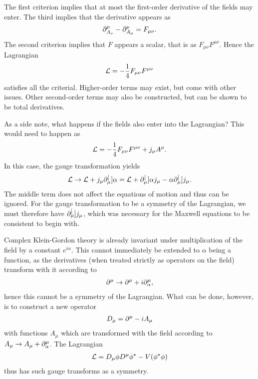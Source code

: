 The first criterion implies that at most the first-order derivative of the fields may enter. The third implies that the derivative appears as
\begin{align*}
	\partial^{\mu}_{A_{\nu}} - \partial^{\nu}_{A_{\mu}} = F_{\mu\nu}.
\end{align*}
The second criterion implies that $F$ appears a scalar, that is as $F_{\mu\nu}F^{\mu\nu}$. Hence the Lagrangian
\begin{align*}
	\mathcal{L} = -\frac{1}{4}F_{\mu\nu}F^{\mu\nu}
\end{align*}
satisfies all the criterial. Higher-order terms may exist, but come with other issues. Other second-order terms may also be constructed, but can be shown to be total derivatives.

As a side note, what happens if the fields also enter into the Lagrangian? This would need to happen as
\begin{align*}
	\mathcal{L} = -\frac{1}{4}F_{\mu\nu}F^{\mu\nu} + j_{\mu}A^{\mu}.
\end{align*}
In this case, the gauge transformation yields
\begin{align*}
	\mathcal{L} \to \mathcal{L} + j_{\mu}\partial^{[}_{\mu}]{}{\alpha} = \mathcal{L} + \partial^{[}_{\mu}]{}{\alpha j_{\mu}} - \alpha\partial^{[}_{\mu}]{}{j_{\mu}}.
\end{align*}
The middle term does not affect the equations of motion and thus can be ignored. For the gauge transformation to be a symmetry of the Lagrangian, we must therefore have $\partial^{[}_{\mu}]{}{j_{\mu}}$, which was necessary for the Maxwell equations to be consistent to begin with.

Complex Klein-Gordon theory is already invariant under multiplication of the field by a constant $e^{i\alpha}$. This cannot immediately be extended to $\alpha$ being a function, as the derivatives (when treated strictly as operators on the field) transform with it according to
\begin{align*}
	\partial^{\mu}_{} \to \partial^{\mu}_{} + i\partial^{\mu}_{\alpha},
\end{align*}
hence this cannot be a symmetry of the Lagrangian. What can be done, however, is to construct a new operator
\begin{align*}
	D_{\mu} = \partial^{\mu}_{} - iA_{\mu}
\end{align*}
with functions $A_{\mu}$ which are transformed with the field according to $A_{\mu} \to A_{\mu} + \partial^{\mu}_{\alpha}$. The Lagrangian
\begin{align*}
	\mathcal{L} = D_{\mu}\phi D^{\mu}\phi^{\star} - V(\phi^{\star}\phi)
\end{align*}
thus has such gauge transforms as a symmetry.

